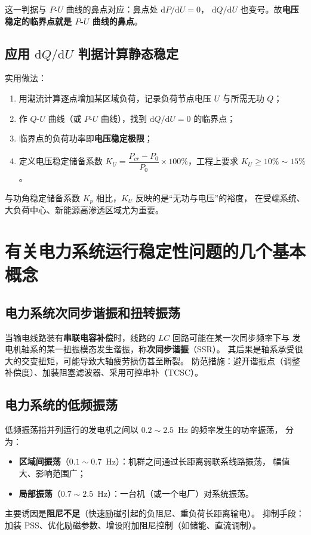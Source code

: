 这一判据与 $P$-$U$ 曲线的鼻点对应：鼻点处 $\mathrm{d}P/\mathrm{d}U=0$，
$\mathrm{d}Q/\mathrm{d}U$ 也变号。故\textbf{电压稳定的临界点就是 $P$-$U$ 曲线的鼻点}。

\subsection{应用 $\mathrm{d}Q/\mathrm{d}U$ 判据计算静态稳定}

实用做法：
\begin{enumerate}
  \item 用潮流计算逐点增加某区域负荷，记录负荷节点电压 $U$ 与所需无功 $Q$；
  \item 作 $Q$-$U$ 曲线（或 $P$-$U$ 曲线），找到 $\mathrm{d}Q/\mathrm{d}U=0$ 的临界点；
  \item 临界点的负荷功率即\textbf{电压稳定极限}；
  \item 定义电压稳定储备系数
        $K_U=\dfrac{P_{cr}-P_0}{P_0}\times100\%$，工程上要求 $K_U\ge10\%\sim15\%$。
\end{enumerate}
与功角稳定储备系数 $K_p$ 相比，$K_U$ 反映的是“无功与电压”的裕度，
在受端系统、大负荷中心、新能源高渗透区域尤为重要。

\section{有关电力系统运行稳定性问题的几个基本概念}

\subsection{电力系统次同步谐振和扭转振荡}

当输电线路装有\textbf{串联电容补偿}时，线路的 $LC$ 回路可能在某一次同步频率下与
发电机轴系的某一扭振模态发生谐振，称\textbf{次同步谐振}（SSR）。
其后果是轴系承受很大的交变扭矩，可能导致大轴疲劳损伤甚至断裂。
防范措施：避开谐振点（调整补偿度）、加装阻塞滤波器、采用可控串补（TCSC）。

\subsection{电力系统的低频振荡}

低频振荡指并列运行的发电机之间以 $0.2\sim2.5$~Hz 的频率发生的功率振荡，
分为：
\begin{itemize}
  \item \textbf{区域间振荡}（$0.1\sim0.7$~Hz）：机群之间通过长距离弱联系线路振荡，
        幅值大、影响范围广；
  \item \textbf{局部振荡}（$0.7\sim2.5$~Hz）：一台机（或一个电厂）对系统振荡。
\end{itemize}
主要诱因是\textbf{阻尼不足}（快速励磁引起的负阻尼、重负荷长距离输电）。
抑制手段：加装 PSS、优化励磁参数、增设附加阻尼控制（如储能、直流调制）。

